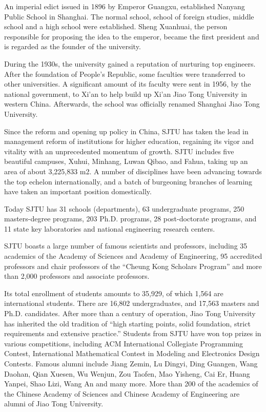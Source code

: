 \begin{englishabstract}

An imperial edict issued in 1896 by Emperor Guangxu, established Nanyang Public School in Shanghai. The normal school, school of foreign studies, middle school and a high school were established. Sheng Xuanhuai, the person responsible for proposing the idea to the emperor, became the first president and is regarded as the founder of the university.

During the 1930s, the university gained a reputation of nurturing top engineers. After the foundation of People's Republic, some faculties were transferred to other universities. A significant amount of its faculty were sent in 1956, by the national government, to Xi'an to help build up Xi'an Jiao Tong University in western China. Afterwards, the school was officially renamed Shanghai Jiao Tong University.

Since the reform and opening up policy in China, SJTU has taken the lead in management reform of institutions for higher education, regaining its vigor and vitality with an unprecedented momentum of growth. SJTU includes five beautiful campuses, Xuhui, Minhang, Luwan Qibao, and Fahua, taking up an area of about 3,225,833 m2. A number of disciplines have been advancing towards the top echelon internationally, and a batch of burgeoning branches of learning have taken an important position domestically.

Today SJTU has 31 schools (departments), 63 undergraduate programs, 250 masters-degree programs, 203 Ph.D. programs, 28 post-doctorate programs, and 11 state key laboratories and national engineering research centers.

SJTU boasts a large number of famous scientists and professors, including 35 academics of the Academy of Sciences and Academy of Engineering, 95 accredited professors and chair professors of the ``Cheung Kong Scholars Program'' and more than 2,000 professors and associate professors.

Its total enrollment of students amounts to 35,929, of which 1,564 are international students. There are 16,802 undergraduates, and 17,563 masters and Ph.D. candidates. After more than a century of operation, Jiao Tong University has inherited the old tradition of ``high starting points, solid foundation, strict requirements and extensive practice.'' Students from SJTU have won top prizes in various competitions, including ACM International Collegiate Programming Contest, International Mathematical Contest in Modeling and Electronics Design Contests. Famous alumni include Jiang Zemin, Lu Dingyi, Ding Guangen, Wang Daohan, Qian Xuesen, Wu Wenjun, Zou Taofen, Mao Yisheng, Cai Er, Huang Yanpei, Shao Lizi, Wang An and many more. More than 200 of the academics of the Chinese Academy of Sciences and Chinese Academy of Engineering are alumni of Jiao Tong University.

\end{englishabstract}
